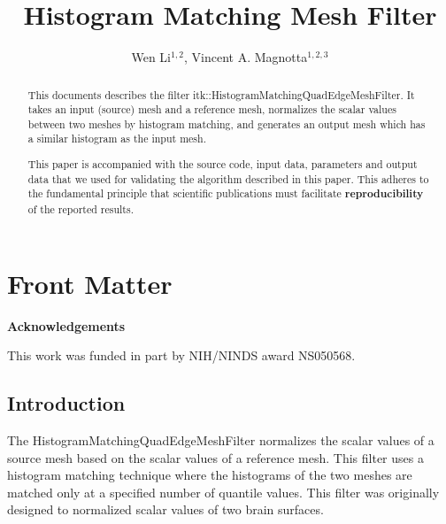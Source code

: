 \documentclass{InsightArticle}
\title{Histogram Matching Mesh Filter}
\author{Wen Li$^{1,2}$, Vincent A. Magnotta$^{1,2,3}$}
\makeatletter
\newcommand\ackname{Acknowledgements}
\newenvironment{acknowledgements}{%
      \titlepage
      \null\vfil
      \@beginparpenalty\@lowpenalty
      \begin{center}%
        \bfseries \ackname
        \@endparpenalty\@M
      \end{center}}%
     {\par\vfil\null\endtitlepage}
\newenvironment{acknowledgements}{%
      \if@twocolumn
        \section*{\abstractname}%
      \else
        \small
        \begin{center}%
          {\bfseries \ackname\vspace{-.5em}\vspace{\z@}}%
        \end{center}%
        \quotation
      \fi}
      {\if@twocolumn\else\endquotation\fi}
\newcommand{\IJhandlerIDnumber}{3205}
\makeatother
\begin{document}
%
% 
\IJhandlefooter{\IJhandlerIDnumber}


\ifpdf
\else
\fi


\maketitle


\ifhtml
\chapter*{Front Matter\label{front}}
\fi

\begin{abstract}
 
This documents describes the filter itk::HistogramMatchingQuadEdgeMeshFilter.  It
takes an input (source) mesh and a reference mesh, normalizes the scalar values 
between two meshes by histogram matching, and generates an output mesh 
which has a similar histogram as the input mesh.

This paper is accompanied with the source code, input data, parameters and
output data that we used for validating the algorithm described in this paper.
This adheres to the fundamental principle that scientific publications must
facilitate \textbf{reproducibility} of the reported results.
\end{abstract}

\begin{acknowledgements}
This work was funded in part by NIH/NINDS award NS050568.
\end{acknowledgements}

\tableofcontents

\section{Introduction}

The HistogramMatchingQuadEdgeMeshFilter normalizes the scalar values of a source
mesh based on the scalar values of a reference mesh. 
This filter uses a histogram matching technique where the histograms of the 
two meshes are matched only at a specified number of quantile values.
This filter was originally designed to normalized scalar values of two
brain surfaces. 
\end{document}
